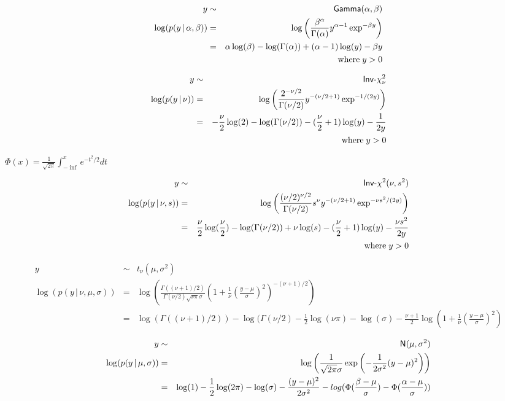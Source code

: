 \documentclass{article}
\begin{document}
\begin{eqnarray*} y &\sim& \mbox{\sf{Gamma}}(\alpha, \beta) \\ \log (p (y \,|\, \alpha, \beta) ) &=& \log \left( \frac{\beta^\alpha}{\Gamma(\alpha)} y^{\alpha - 1} \exp^{- \beta y} \right) \\ &=& \alpha \log(\beta) - \log(\Gamma(\alpha)) + (\alpha - 1) \log(y) - \beta y\\ & & \mathrm{where} \; y > 0 \end{eqnarray*}
\pagebreak

\begin{eqnarray*} y &\sim& \mbox{\sf{Inv-}}\chi^2_\nu \\ \log (p (y \,|\, \nu)) &=& \log \left( \frac{2^{-\nu / 2}}{\Gamma (\nu / 2)} y^{- (\nu / 2 + 1)} \exp^{-1 / (2y)} \right) \\ &=& - \frac{\nu}{2} \log(2) - \log (\Gamma (\nu / 2)) - (\frac{\nu}{2} + 1) \log(y) - \frac{1}{2y} \\ & & \mathrm{ where } \; y > 0 \end{eqnarray*}
\pagebreak

$\Phi(x) = \frac{1}{\sqrt{2 \pi}} \int_{-\inf}^x e^{-t^2/2} dt$
\pagebreak

\begin{eqnarray*} y &\sim& \mbox{\sf{Inv-}}\chi^2(\nu, s^2) \\ \log (p (y \,|\, \nu, s)) &=& \log \left( \frac{(\nu / 2)^{\nu / 2}}{\Gamma (\nu / 2)} s^\nu y^{- (\nu / 2 + 1)} \exp^{-\nu s^2 / (2y)} \right) \\ &=& \frac{\nu}{2} \log(\frac{\nu}{2}) - \log (\Gamma (\nu / 2)) + \nu \log(s) - (\frac{\nu}{2} + 1) \log(y) - \frac{\nu s^2}{2y} \\ & & \mathrm{ where } \; y > 0 \end{eqnarray*}
\pagebreak

\begin{eqnarray*} y &\sim& t_{\nu} (\mu, \sigma^2) \\ \log (p (y \,|\, \nu, \mu, \sigma) ) &=& \log \left( \frac{\Gamma((\nu + 1) /2)} {\Gamma(\nu/2)\sqrt{\nu \pi} \sigma} \left( 1 + \frac{1}{\nu} (\frac{y - \mu}{\sigma})^2 \right)^{-(\nu + 1)/2} \right) \\ &=& \log( \Gamma( (\nu+1)/2 )) - \log (\Gamma (\nu/2) - \frac{1}{2} \log(\nu \pi) - \log(\sigma) -\frac{\nu + 1}{2} \log (1 + \frac{1}{\nu} (\frac{y - \mu}{\sigma})^2) \end{eqnarray*}
\pagebreak

\begin{eqnarray*} y &\sim& \mbox{\sf{N}} (\mu, \sigma^2) \\ \log (p (y \,|\, \mu, \sigma) ) &=& \log \left( \frac{1}{\sqrt{2 \pi} \sigma} \exp \left( - \frac{1}{2 \sigma^2} (y - \mu)^2 \right) \right) \\ &=& \log (1) - \frac{1}{2}\log (2 \pi) - \log (\sigma) - \frac{(y - \mu)^2}{2 \sigma^2} - log(\Phi(\frac{\beta - \mu}{\sigma}) - \Phi(\frac{\alpha - \mu}{\sigma})) \end{eqnarray*}
\pagebreak
\end{document}
